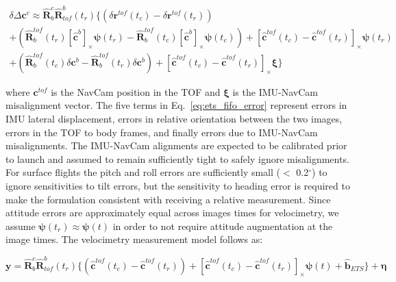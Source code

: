 \begin{multline} \label{eq:ets_fifo_error}
    \delta \Delta \bm{c}^{c} \approx \hat{\bm{R}}_{b}^{c}\hat{\bm{R}}_{tof}^{b}\left(t_{r}\right)\biggl\{\left( \delta \bm{r}^{tof} \left(t_{c}\right) - \delta \bm{r}^{tof}\left(t_{r}\right) \right) \\ + 
    \left( \hat{\bm{R}}_{b}^{tof}\left(t_{r}\right) \left[\hat{\bm{c}}^{b}\right]_{\times}\bm{\psi} \left(t_{r}\right) -  \hat{\bm{R}}_{b}^{tof}\left(t_{c}\right) \left[\hat{\bm{c}}^{b}\right]_{\times}\bm{\psi} \left(t_{c}\right)\right)  + 
    \left[\hat{\bm{c}}^{tof}\left(t_{c}\right) - \hat{\bm{c}}^{tof}\left(t_{r}\right)\right]_{\times}\bm{\psi} \left(t_{r}\right)   \\ +
     \left( \hat{\bm{R}}_{b}^{tof}\left(t_{c}\right)\delta\bm{c}^{b} - \hat{\bm{R}}_{b}^{tof}\left(t_{r}\right)\delta{\bm{c}}^{b}  \right)                             + 
   \left[\hat{\bm{c}}^{tof}\left(t_{c}\right) - \hat{\bm{c}}^{tof}\left(t_{r}\right)\right]_{\times}\bm{\xi}\biggl\}
\end{multline}

\noindent where $\bm{c}^{tof}$ is the NavCam position in the TOF and $\bm{\xi}$ is the IMU-NavCam misalignment vector. The five terms in Eq.~\ref{eq:ets_fifo_error} represent errors in IMU lateral displacement, errors in relative orientation between the two images,  errors in the TOF to body frames, and finally errors due to IMU-NavCam misalignments. The IMU-NavCam alignments are expected to be calibrated prior to launch and assumed to remain sufficiently tight to safely ignore misalignments. For surface flights the pitch and roll errors are sufficiently small ($<$ 0.2$^\circ$) to ignore sensitivities to tilt errors, but the sensitivity to heading error is required to make the formulation consistent with receiving a relative measurement. Since attitude errors are approximately equal across images times for velocimetry, we assume $\bm{\psi} \left(t_{r}\right) \approx \bm{\psi} \left(t\right)$ in order to not require attitude augmentation at the image times. The velocimetry measurement model follows as: 

\begin{equation} \label{eq:ets_fifo_meas}
    \bm{y} = \hat{\bm{R}}_{b}^{c}\hat{\bm{R}}_{tof}^{b}\left(t_{r}\right)\biggl\{\left( \hat{\bm{c}}^{tof} \left(t_{c}\right) - \hat{\bm{c}}^{tof}\left(t_{r}\right) \right) + 
    \left[\hat{\bm{c}}^{tof}\left(t_{c}\right) - \hat{\bm{c}}^{tof}\left(t_{r}\right)\right]_{\times}\bm{\psi} \left(t\right) + \hat{\bm{b}}_{ETS} \biggl\} +  \bm{\eta}
\end{equation}

